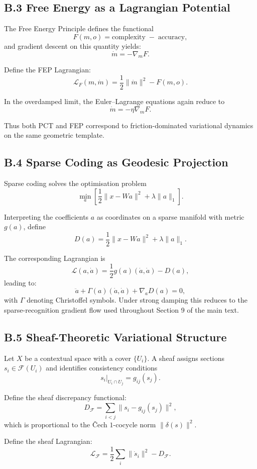 \documentclass[11pt,a4paper,twoside]{article}
\begin{document}
\subsection*{B.3 Free Energy as a Lagrangian Potential}

The Free Energy Principle defines the functional
\[
F(m,o) = \mathrm{complexity} \;-\; \mathrm{accuracy},
\]
and gradient descent on this quantity yields:
\[
\dot{m} = -\nabla_m F.
\]

Define the FEP Lagrangian:
\[
\mathcal{L}_F(m,\dot{m}) = \frac{1}{2}\|\dot{m}\|^2 - F(m,o).
\]

In the overdamped limit, the Euler--Lagrange equations again reduce to
\[
\dot{m} = -\eta \nabla_m F.
\]

Thus both PCT and FEP correspond to friction-dominated variational dynamics on the same geometric template.

\subsection*{B.4 Sparse Coding as Geodesic Projection}

Sparse coding solves the optimisation problem
\[
\min_{a}\left[ \frac{1}{2}\|x - Wa\|^2 + \lambda\|a\|_1 \right].
\]

Interpreting the coefficients $a$ as coordinates on a sparse manifold with metric $g(a)$, define
\[
D(a) = \frac{1}{2}\|x - Wa\|^2 + \lambda\|a\|_1.
\]

The corresponding Lagrangian is
\[
\mathcal{L}(a,\dot{a}) = \frac{1}{2}g(a)(\dot{a},\dot{a}) - D(a),
\]
leading to:
\[
\ddot{a} + \Gamma(a)(\dot{a},\dot{a}) + \nabla_a D(a) = 0,
\]
with $\Gamma$ denoting Christoffel symbols. Under strong damping this reduces to the sparse-recognition gradient flow used throughout Section 9 of the main text.

\subsection*{B.5 Sheaf-Theoretic Variational Structure}

Let $X$ be a contextual space with a cover $\{U_i\}$. A sheaf assigns sections $s_i \in \mathcal{F}(U_i)$ and identifies consistency conditions
\[
s_i|_{U_i\cap U_j} = g_{ij}(s_j).
\]

Define the sheaf discrepancy functional:
\[
D_{\mathcal{F}} = \sum_{i<j} \|s_i - g_{ij}(s_j)\|^2,
\]
which is proportional to the Čech $1$-cocycle norm $\|\delta(s)\|^2$.

Define the sheaf Lagrangian:
\[
\mathcal{L}_{\mathcal{F}} = \frac{1}{2}\sum_i \|\dot{s}_i\|^2 - D_{\mathcal{F}}.
\]
\end{document}
